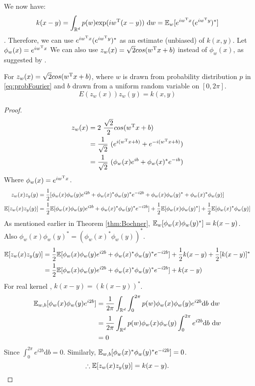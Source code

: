 \documentclass[twoside]{memoir}
\begin{document}
We now have:
\[ k(x - y) = \int_{\mathbb{R}^d} p(w) \text{exp}(iw^{\text{T}}(x - y)) ~ \text{d}w = \mathbb{E}_w[e^{iw^{\text{T}}x}(e^{iw^{\text{T}}y})^*] \].
Therefore, we can use $e^{iw^{\text{T}}x}(e^{iw^{\text{T}}y})^*$ as an estimate (unbiased) of $k(x, y)$.
Let $\phi_w(x) = e^{iw^{\text{T}}x}$
We can also use $z_w(x) = \sqrt{2}cos(w^{\text{T}}x + b)$ instead of $\phi_w(x)$, as suggested by \cite{RFF_Rahimi}.
\begin{prop}
	For $z_w(x) = \sqrt{2}cos(w^{\text{T}}x + b)$, where $w$ is drawn from probability distribution $p$ in \eqref{eq:probFourier} and $b$ drawn from a uniform random variable on $[0, 2\pi]$.
	\[E(z_w(x))z_w(y) = k(x,y)\]
\end{prop}
\begin{proof}
	\begin{equation*}
	\begin{split}
	z_w(x) &= 2 ~ \frac{\sqrt{2}}{2}cos(w^{\text{T}}x + b) \\
	&= \frac{1}{\sqrt{2}}~(e^{i(w^{\text{T}}x+b)} + e^{-i(w^{\text{T}}x+b)}) \\
	&= \frac{1}{\sqrt{2}}~(\phi_w(x)e^{ib} + \phi_w(x)^* e^{-ib})
	\end{split}
	\end{equation*}
	Where $\phi_w(x) = e^{iw^{\text{T}}x}$.
	\begin{equation*}
	\begin{split}
	z_w(x)z_y(y) &= \frac{1}{2}[\phi_w(x)\phi_w(y)e^{i2b} + \phi_w(x)^*\phi_w(y)^*e^{-i2b}
	+ \phi_w(x)\phi_w(y)^* + \phi_w(x)^*\phi_w(y)] \\
	\mathbb{E}[z_w(x)z_y(y)] &= \frac{1}{2}\mathbb{E}[\phi_w(x)\phi_w(y)e^{i2b} + \phi_w(x)^*\phi_w(y)^*e^{-i2b}]
	+ \frac{1}{2}\mathbb{E}[\phi_w(x)\phi_w(y)^*] + \frac{1}{2}\mathbb{E}[\phi_w(x)^*\phi_w(y)] \\ 
	\end{split}
	\end{equation*}
	As mentioned earlier in Theorem \ref{thm:Bochner}, $\mathbb{E}_w[\phi_w(x)\phi_w(y)^*] = k(x - y)$.
	Also $\phi_w(x)\phi_w(y)^* = (\phi_w(x)^*\phi_w(y))^*$.
	\begin{equation*}
	\begin{split}
	\mathbb{E}[z_w(x)z_y(y)] &= \frac{1}{2}\mathbb{E}[\phi_w(x)\phi_w(y)e^{i2b} + \phi_w(x)^*\phi_w(y)^*e^{-i2b}]
	+ \frac{1}{2}k(x-y) + \frac{1}{2}[k(x-y)]^* \\
	&= \frac{1}{2}\mathbb{E}[\phi_w(x)\phi_w(y)e^{i2b} + \phi_w(x)^*\phi_w(y)^*e^{-i2b}] + k(x-y)
	\end{split}
	\end{equation*}
	For real kernel , $k(x - y) = (k(x - y))^*$.
	\begin{equation*}
	\begin{split}
	\mathbb{E}_{w,b}[\phi_w(x)\phi_w(y)e^{i2b}] &= \frac{1}{2\pi}\int_{\mathbb{R}^d}\int_{0}^{2\pi} p(w)\phi_w(x)\phi_w(y)e^{i2b} \text{d}b~\text{d}w \\
	&= \frac{1}{2\pi}\int_{\mathbb{R}^d} p(w)\phi_w(x)\phi_w(y) \int_{0}^{2\pi} e^{i2b} \text{d}b~\text{d}w \\
	&= 0
	\end{split}
	\end{equation*}
	Since $\int_{0}^{2\pi} e^{i2b} \text{d}b = 0$. Similarly, $	\mathbb{E}_{w,b}[\phi_w(x)^*\phi_w(y)^*e^{-i2b}] = 0$.
	\[ \therefore \mathbb{E}[z_w(x)z_y(y)] = k(x - y). \]
	

\end{proof}
\end{document}

